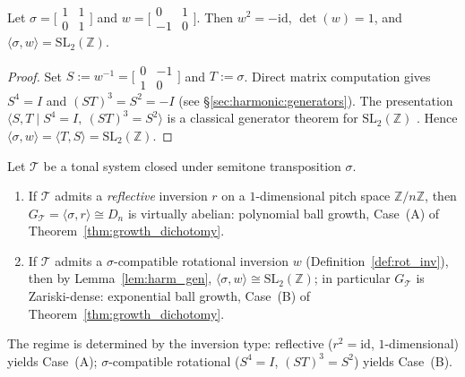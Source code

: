 \begin{lemma}
  \label{lem:harm_gen}
  Let $\sigma = \bigl[\begin{smallmatrix}1&1\\0&1\end{smallmatrix}\bigr]$ and
  $w = \bigl[\begin{smallmatrix}0&1\\-1&0\end{smallmatrix}\bigr]$.
  Then $w^2 = -\mathrm{id}$, $\det(w) = 1$, and
  $\langle \sigma, w \rangle = \mathrm{SL}_2(\mathbb{Z})$.
\end{lemma}

\begin{proof}
  Set $S := w^{-1} = \bigl[\begin{smallmatrix}0&-1\\1&0\end{smallmatrix}\bigr]$
  and $T := \sigma$.
  Direct matrix computation gives $S^4 = I$ and $(ST)^3 = S^2 = -I$
  (see \S\ref{sec:harmonic:generators}).
  The presentation $\langle S, T \mid S^4 = I,\ (ST)^3 = S^2 \rangle$
  is a classical generator theorem for $\mathrm{SL}_2(\mathbb{Z})$
  \cite{lubotzky1994discrete}.
  Hence $\langle \sigma, w \rangle = \langle T, S \rangle = \mathrm{SL}_2(\mathbb{Z})$.
\end{proof}

\begin{proposition}
  \label{prop:tonal_dict}
  Let $\mathcal{T}$ be a tonal system closed under semitone transposition $\sigma$.
  \begin{enumerate}
    \item[\emph{(A)}] If $\mathcal{T}$ admits a \emph{reflective} inversion $r$
      on a $1$-dimensional pitch space $\mathbb{Z}/n\mathbb{Z}$, then
      $G_\mathcal{T} = \langle\sigma, r\rangle \cong D_n$ is virtually abelian:
      polynomial ball growth, Case~(A) of Theorem~\ref{thm:growth_dichotomy}.
    \item[\emph{(B)}] If $\mathcal{T}$ admits a $\sigma$-compatible rotational
      inversion $w$ (Definition~\ref{def:rot_inv}), then by
      Lemma~\ref{lem:harm_gen},
      $\langle\sigma,w\rangle \cong \mathrm{SL}_2(\mathbb{Z})$;
      in particular $G_\mathcal{T}$ is Zariski-dense:
      exponential ball growth, Case~(B) of
      Theorem~\ref{thm:growth_dichotomy}.
  \end{enumerate}
  The regime is determined by the inversion type: reflective ($r^2=\mathrm{id}$,
  $1$-dimensional) yields Case~(A); $\sigma$-compatible rotational
  ($S^4=I$, $(ST)^3=S^2$) yields Case~(B).
\end{proposition}

